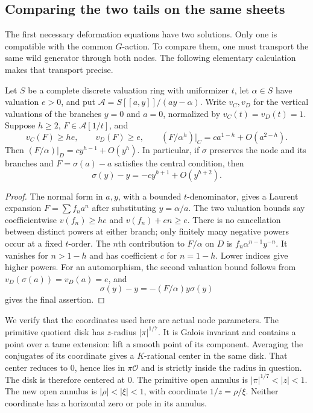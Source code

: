 \subsection{Comparing the two tails on the same sheets}

The first necessary deformation equations have two solutions.
Only one is compatible with the common $G$-action.  To compare them,
one must transport the same wild generator through both nodes.
The following elementary calculation makes that transport precise.

\begin{lemma}
\label{lem:harmonic-node-coefficient}
Let $S$ be a complete discrete valuation ring with uniformizer $t$,
let $\alpha\in S$ have valuation $e>0$, and put
$\mathcal A=S[[a,y]]/(ay-\alpha)$.
Write $v_C,v_D$ for the vertical valuations of the branches $y=0$
and $a=0$, normalized by $v_C(t)=v_D(t)=1$.
Suppose $h\ge2$, $F\in\mathcal A[1/t]$, and
\[
 v_C(F)\ge he,\qquad v_D(F)\ge e,\qquad
 (F/\alpha^h)|_C=c a^{1-h}+O(a^{2-h}).
\]
Then $(F/\alpha)|_D=c y^{h-1}+O(y^h)$.
In particular, if $\sigma$ preserves the node and its branches and
$F=\sigma(a)-a$ satisfies the central condition, then
\[
 \sigma(y)-y=-c y^{h+1}+O(y^{h+2}).
\]
\end{lemma}

\begin{proof}
The normal form in $a,y$, with a bounded $t$-denominator, gives a
Laurent expansion $F=\sum f_na^n$ after substituting $y=\alpha/a$.
The two valuation bounds say coefficientwise
$v(f_n)\ge he$ and $v(f_n)+en\ge e$.
There is no cancellation between distinct powers at either branch;
only finitely many negative powers occur at a fixed $t$-order.
The $n$th contribution to $F/\alpha$ on $D$ is
$f_n\alpha^{n-1}y^{-n}$.  It vanishes for $n>1-h$ and has
coefficient $c$ for $n=1-h$.  Lower indices give higher powers.
For an automorphism, the second valuation bound follows from
$v_D(\sigma(a))=v_D(a)=e$, and
\[
 \sigma(y)-y=-(F/\alpha)y\sigma(y)
\]
gives the final assertion.
\end{proof}

We verify that the coordinates used here are actual node parameters.
The primitive quotient disk has $z$-radius $|\pi|^{1/7}$.
It is Galois invariant and contains a point over a tame extension:
lift a smooth point of its component.  Averaging the conjugates of
its coordinate gives a $K$-rational center in the same disk.
That center reduces to $0$, hence lies in $\pi\mathcal O$ and is
strictly inside the radius in question.  The disk is therefore
centered at $0$.  The primitive open annulus is
$|\pi|^{1/7}<|z|<1$.  The new open annulus is
$|\rho|<|\xi|<1$, with coordinate $1/z=\rho/\xi$.
Neither coordinate has a horizontal zero or pole in its annulus.

